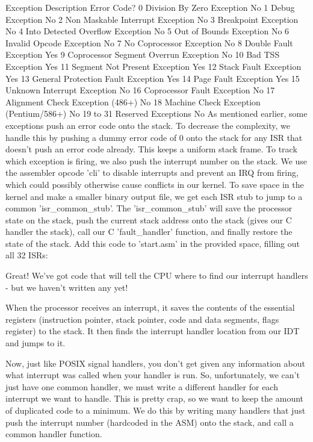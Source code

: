 \documentclass[11pt]{article}
\begin{document}
Exception  Description	 Error Code?
0	Division By Zero Exception	No
1	Debug Exception	No
2	Non Maskable Interrupt Exception	No
3	Breakpoint Exception	No
4	Into Detected Overflow Exception	No
5	Out of Bounds Exception	No
6	Invalid Opcode Exception	No
7	No Coprocessor Exception	No
8	Double Fault Exception	Yes
9	Coprocessor Segment Overrun Exception	No
10	Bad TSS Exception	Yes
11	Segment Not Present Exception	Yes
12	Stack Fault Exception	Yes
13	General Protection Fault Exception	Yes
14	Page Fault Exception	Yes
15	Unknown Interrupt Exception	No
16	Coprocessor Fault Exception	No
17	Alignment Check Exception (486+)	No
18	Machine Check Exception (Pentium/586+)	No
19 to 31	Reserved Exceptions	No
As mentioned earlier, some exceptions push an error code onto the stack. To decrease the complexity, we handle this by pushing a dummy error code of 0 onto the stack for any ISR that doesn't push an error code already. This keeps a uniform stack frame. To track which exception is firing, we also push the interrupt number on the stack. We use the assembler opcode 'cli' to disable interrupts and prevent an IRQ from firing, which could possibly otherwise cause conflicts in our kernel. To save space in the kernel and make a smaller binary output file, we get each ISR stub to jump to a common 'isr\_common\_stub'. The 'isr\_common\_stub' will save the processor state on the stack, push the current stack address onto the stack (gives our C handler the stack), call our C 'fault\_handler' function, and finally restore the state of the stack. Add this code to 'start.asm' in the provided space, filling out all 32 ISRs:


Great! We've got code that will tell the CPU where to find our interrupt handlers - but we haven't written any yet!

When the processor receives an interrupt, it saves the contents of the essential registers (instruction pointer, stack pointer, code and data segments, flags register) to the stack. It then finds the interrupt handler location from our IDT and jumps to it.

Now, just like POSIX signal handlers, you don't get given any information about what interrupt was called when your handler is run. So, unfortunately, we can't just have one common handler, we must write a different handler for each interrupt we want to handle. This is pretty crap, so we want to keep the amount of duplicated code to a minimum. We do this by writing many handlers that just push the interrupt number (hardcoded in the ASM) onto the stack, and call a common handler function.
\end{document}
